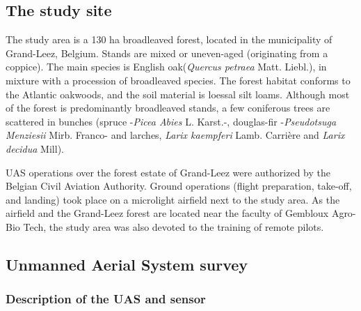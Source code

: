 \documentclass[remotesensing,article,submit,moreauthors,pdftex,12pt,a4paper]{mdpi} %
\begin{document}
\subsection{The study site}

The study area is a 130 ha broadleaved forest, located in the municipality of Grand-Leez, Belgium. 
Stands are mixed or uneven-aged (originating from a coppice). 
The main species is English oak(\textit{Quercus petraea} Matt. Liebl.), in mixture with a procession of broadleaved species. 
The forest habitat conforms to the Atlantic oakwoods, and the soil material is loessal silt loams. 
Although most of the forest is predominantly broadleaved stands, a few coniferous trees are scattered in bunches (spruce -\textit{Picea Abies} L. Karst.-, douglas-fir -\textit{Pseudotsuga Menziesii} Mirb. Franco- and larches, \textit{Larix kaempferi} Lamb. Carrière and \textit{Larix decidua} Mill).

UAS operations over the forest estate of Grand-Leez were authorized by the Belgian Civil Aviation Authority. 
Ground operations (flight preparation, take-off, and landing) took place on a microlight airfield next to the study area. 
As the airfield and the Grand-Leez forest are located near the faculty of Gembloux Agro-Bio Tech, the study area was also devoted to the training of remote pilots. 



\subsection{Unmanned Aerial System survey}

\subsubsection{Description of the UAS and sensor}
\end{document}
